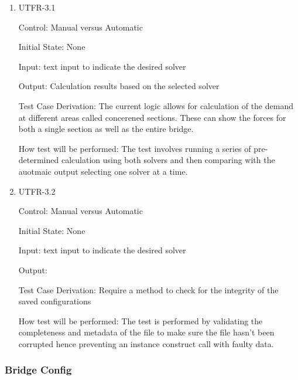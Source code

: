 \documentclass[12pt, titlepage]{article}
\begin{document}
\begin{enumerate}

\item{UTFR-3.1\\}

Control: Manual versus Automatic
					
Initial State: None
					
Input: text input to indicate the desired solver 
					
Output: Calculation results based on the selected solver

Test Case Derivation: The current logic allows for calculation of the demand at different areas called concerened sections. These can show the forces for both a single section as well as the entire bridge. 

How test will be performed: The test involves running a series of pre-determined calculation using both solvers and then comparing with the auotmaic output selecting one solver at a time. 
					
\item{UTFR-3.2\\}

Control: Manual versus Automatic
					
Initial State: None
					
Input: text input to indicate the desired solver  
					
Output: 

Test Case Derivation: Require a method to check for the integrity of the saved configurations

How test will be performed: The test is performed by validating the completeness and metadata of the file to make sure the file hasn't been corrupted hence preventing an instance construct call with faulty data.

\end{enumerate}

\subsubsection{Bridge Config}
\end{document}

